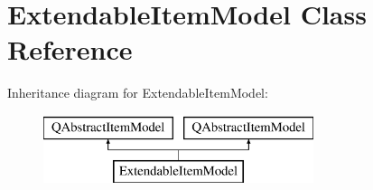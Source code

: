 \hypertarget{class_extendable_item_model}{}\section{Extendable\+Item\+Model Class Reference}
\label{class_extendable_item_model}
Inheritance diagram for Extendable\+Item\+Model\+:\begin{figure}[H]
\begin{center}
\leavevmode
\includegraphics[height=2.000000cm]{class_extendable_item_model}
\end{center}
\end{figure}
